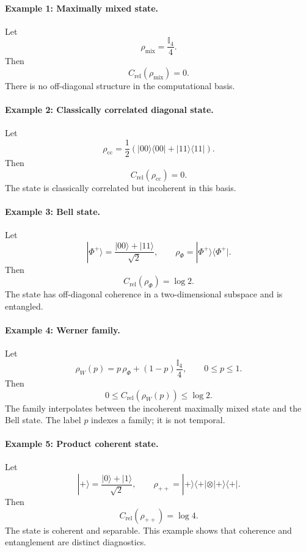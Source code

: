 \documentclass[aps,prx,onecolumn,11pt]{revtex4-2}
\theoremstyle{plain}
\theoremstyle{definition}
\theoremstyle{remark}
\begin{document}
\paragraph{Example 1: Maximally mixed state.}

Let
\[
\rho_{\mathrm{mix}}=\frac{\mathbb I_4}{4}.
\]
Then
\[
C_{\mathrm{rel}}(\rho_{\mathrm{mix}})=0.
\]
There is no off-diagonal structure in the computational basis.

\paragraph{Example 2: Classically correlated diagonal state.}

Let
\[
\rho_{\mathrm{cc}}
=
\frac12
\left(
|00\rangle\langle 00|
+
|11\rangle\langle 11|
\right).
\]
Then
\[
C_{\mathrm{rel}}(\rho_{\mathrm{cc}})=0.
\]
The state is classically correlated but incoherent in this basis.

\paragraph{Example 3: Bell state.}

Let
\[
|\Phi^+\rangle
=
\frac{|00\rangle+|11\rangle}{\sqrt 2},
\qquad
\rho_\Phi
=
|\Phi^+\rangle\langle\Phi^+|.
\]
Then
\[
C_{\mathrm{rel}}(\rho_\Phi)=\log 2.
\]
The state has off-diagonal coherence in a two-dimensional subspace and
is entangled.

\paragraph{Example 4: Werner family.}

Let
\[
\rho_W(p)
=
p\,\rho_\Phi
+
(1-p)\frac{\mathbb I_4}{4},
\qquad
0\leq p\leq 1.
\]
Then
\[
0\leq C_{\mathrm{rel}}(\rho_W(p))\leq \log 2.
\]
The family interpolates between the incoherent maximally mixed state and
the Bell state. The label \(p\) indexes a family; it is not temporal.

\paragraph{Example 5: Product coherent state.}

Let
\[
|+\rangle
=
\frac{|0\rangle+|1\rangle}{\sqrt 2},
\qquad
\rho_{++}
=
|+\rangle\langle +|
\otimes
|+\rangle\langle +|.
\]
Then
\[
C_{\mathrm{rel}}(\rho_{++})=\log 4.
\]
The state is coherent and separable. This example shows that coherence
and entanglement are distinct diagnostics.
\end{document}
